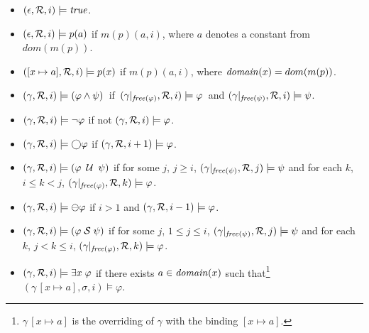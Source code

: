 \begin{itemize}

\item $( \epsilon , {\cal R} , i ) \models \mathit{true}$.

\item $( \epsilon ,  {\cal R} , i )
 \models p ( a ) $ if $m(p) ( a, i )$, where $a$ denotes a constant from  $dom (m(p))$.

\item $( [ x \mapsto a ] , {\cal R} , i ) \models p ( x )$ if $m(p)  ( a , i )$, where $\mathit{domain} (x) = dom ( m ( p ))$.

\item $( \gamma,  {\cal R} , i ) \models ( \varphi \wedge \psi ) $~if~$(
\gamma |_{\mathit{free}  ( \varphi )} , {\cal R} , i ) \models \varphi$~and 
$( \gamma |_{\mathit{free} ( \psi ) } , {\cal R} , i ) \models \psi$. 

\item $( \gamma , {\cal R} , i ) \models \neg \varphi$ if not $( \gamma , {\cal R} , i ) 
\models \varphi$.

\item $( \gamma , {\cal R} , i) \models \bigcirc \varphi$ if 
$(\gamma , {\cal R} , i + 1) \models
\varphi$.

\item $( \gamma , {\cal R} , i ) \models ( \varphi \; \mathbin{\mathcal{U}} \; \psi )$ if
for some $j$, $j \geq i$, $( \gamma |_{\mathit{free} ( \psi )} , {\cal R} , j) 
\models \psi $ and for each $k$,  $i \leq k < j $,
$( \gamma |_{\mathit{free} ( \varphi )} , {\cal R} , k) \models \varphi$.


\item $( \gamma , {\cal R} , i) \models \ominus \varphi$ if $i>1$ and
$(\gamma , {\cal R} , i-1) \models
\varphi$.

\item $( \gamma , {\cal R} , i ) \models ( \varphi \; {\cal S} \; \psi )$ if
for some $j$, $1 \le j \leq i$, $( \gamma |_{\mathit{free} ( \psi )} , {\cal R} , j) 
\models \psi $ and for each $k$, $j < k \leq i$,
$( \gamma |_{\mathit{free} ( \varphi )} , {\cal R} , k) \models \varphi$.





\item $( \gamma , {\cal R} , i) \models \exists x \; \varphi$ if
there exists $a \in \mathit{domain} ( x )$ such that\footnote{$\gamma \, [ x \mapsto a ]$
is the overriding of $\gamma$ with the binding $[ x \mapsto a ]$.}
$( \gamma \, [ x \mapsto a ], \sigma , i) \models \varphi$.

\end{itemize}

